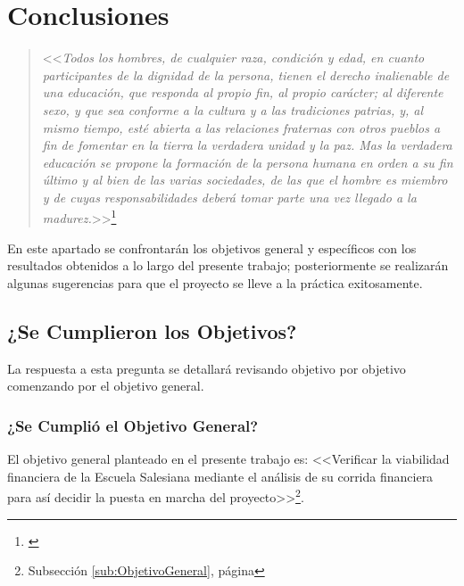 \chapter*{Conclusiones}
\label{ch:Conclusiones}

\begin{quote}
<<\textit{Todos los hombres, de cualquier raza, condición y edad, en cuanto participantes de la dignidad de la persona, tienen el derecho inalienable de una educación, que responda al propio fin, al propio carácter; al diferente sexo, y que sea conforme a la cultura y a las tradiciones patrias, y, al mismo tiempo, esté abierta a las relaciones fraternas con otros pueblos a fin de fomentar en la tierra la verdadera unidad y la paz. Mas la verdadera educación se propone la formación de la persona humana en orden a su fin último y al bien de las varias sociedades, de las que el hombre es miembro y de cuyas responsabilidades deberá tomar parte una vez llegado a la madurez.}>>\footnote{\citep{GRED1965}}
\end{quote}

En este apartado se confrontarán los objetivos general y específicos con los resultados obtenidos a lo largo del presente trabajo; posteriormente se realizarán algunas sugerencias para que el proyecto se lleve a la práctica exitosamente.

\pagebreak
\section*{¿Se Cumplieron los Objetivos?}

La respuesta a esta pregunta se detallará revisando objetivo por objetivo comenzando por el objetivo general.

\subsection*{¿Se Cumplió el Objetivo General?}


El objetivo general planteado en el presente trabajo es: <<Verificar la viabilidad financiera de la Escuela Salesiana mediante el análisis de su corrida financiera para así decidir la puesta en marcha del proyecto>>\footnote{Subsección \ref{sub:ObjetivoGeneral}, página \pageref{sub:ObjetivoGeneral}}.

